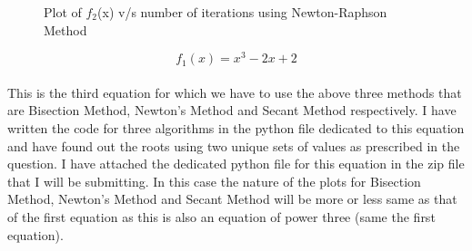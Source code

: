 \documentclass[12pt,a4paper]{article}
\begin{document}
\clearpage
\begin{figure}[!ht]
	\begin{center}
	\end{center}
	\caption{Plot of $f_2$(x) v/s number of iterations using Newton-Raphson Method}
\end{figure}
\begin{equation}
	\text{$f_1$}(x) = \text{$x^3$} - \text{$2x$} + 2
\end{equation}
\\This is the third equation for which we have to use the above three methods that are Bisection Method, Newton's Method and Secant Method respectively. I have written the code for  three algorithms in the python file dedicated to this equation  and have found out the roots using two unique sets of values as prescribed in the question. I have attached the dedicated python file for this equation in the zip file that I will be submitting. In this case the nature of the plots for Bisection Method, Newton's Method and Secant Method will be more or less same as that of the first equation as this is also an equation of power three (same the first equation).
\end{document}
